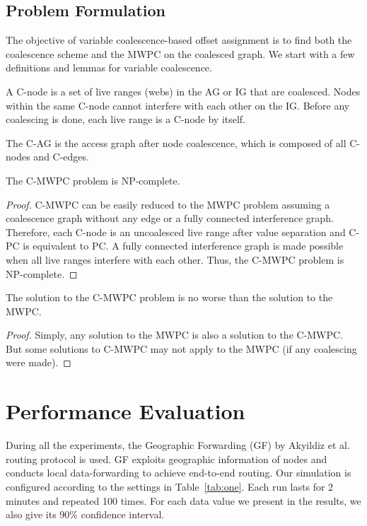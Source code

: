 \subsection{Problem Formulation}

The objective of variable coalescence-based offset assignment is to find
both the coalescence scheme and the MWPC on the coalesced graph. We start
with a few definitions and lemmas for variable coalescence.

\begin{definition}A C-node is a set of
live ranges (webs) in the AG or IG that are coalesced. Nodes within the same
C-node cannot interfere with each other on the IG. Before any coalescing is
done, each live range is a C-node by itself.
\end{definition}

\begin{definition}The C-AG is the access
graph after node coalescence, which is composed of all C-nodes and C-edges.
\end{definition}

\begin{lemma}
The C-MWPC problem is NP-complete.
\end{lemma}
\begin{proof} C-MWPC can be easily reduced to the MWPC problem assuming a
coalescence graph without any edge or a fully connected interference graph.
Therefore, each C-node is an uncoalesced live range after value separation
and C-PC is equivalent to PC. A fully connected interference graph is made
possible when all live ranges interfere with each other. Thus, the C-MWPC
problem is NP-complete.
\end{proof}

\begin{lemma}The solution to the C-MWPC problem is no
worse than the solution to the MWPC.
\end{lemma}
\begin{proof}
Simply, any solution to the MWPC is also a solution to the
C-MWPC. But some solutions to C-MWPC may not apply to the MWPC (if any
coalescing were made).
\end{proof}

\section{Performance Evaluation}

During all the experiments, the Geographic Forwarding (GF) by Akyildiz
et al.~ routing protocol is used. GF exploits
geographic information of nodes and conducts local data-forwarding to
achieve end-to-end routing. Our simulation is configured according to
the settings in Table~\ref{tab:one}. Each run lasts for 2 minutes and
repeated 100 times. For each data value we present in the results, we
also give its 90\% confidence interval.

